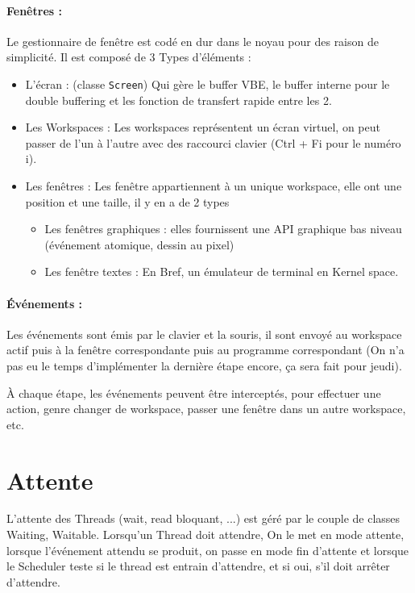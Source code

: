 \documentclass[12pt]{report}
\begin{document}
\paragraph{Fenêtres :} Le gestionnaire de fenêtre est codé en dur dans le noyau pour des raison de
simplicité.
Il est composé de 3 Types d'éléments :
\begin{itemize}
\item L'écran : (classe \verb$Screen$) Qui gère le buffer VBE, le buffer
  interne pour le double buffering et les fonction de transfert rapide entre les
  2.
\item Les Workspaces : Les workspaces représentent un écran virtuel, on peut
  passer de l'un à l'autre avec des raccourci clavier (Ctrl + Fi pour le numéro
  i).
\item Les fenêtres : Les fenêtre appartiennent à un unique workspace, elle ont
  une position et une taille, il y en a de 2 types
  \begin{itemize}
    \item Les fenêtres graphiques : elles fournissent une API graphique bas
      niveau (événement atomique, dessin au pixel)
    \item Les fenêtre textes : En Bref, un émulateur de terminal en Kernel space.
  \end{itemize}
\end{itemize}

\paragraph{Événements :} Les événements sont émis par le clavier et la souris,
il sont envoyé au workspace actif puis à la fenêtre correspondante puis au
programme correspondant (On n'a pas eu le temps d'implémenter la dernière étape
encore, ça sera fait pour jeudi).

À chaque étape, les événements peuvent être interceptés, pour effectuer une
action, genre changer de workspace, passer une fenêtre dans un autre workspace, etc.

\section{Attente}

L'attente des Threads (wait, read bloquant, ...) est géré par le couple de
classes Waiting, Waitable. Lorsqu'un Thread doit attendre, On le met en mode
attente, lorsque l'événement attendu se produit, on passe en mode fin d'attente
et lorsque le Scheduler teste si le thread est entrain d'attendre, et si oui,
s'il doit arrêter d'attendre. 
\end{document}
